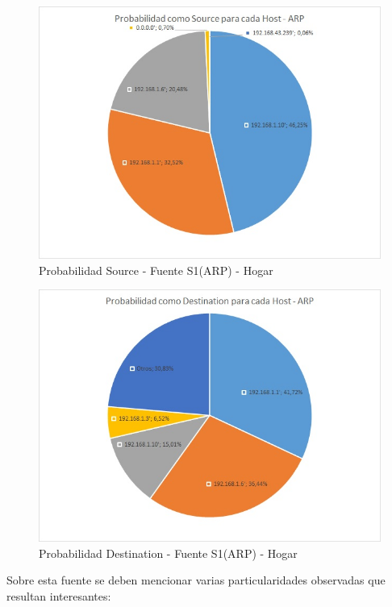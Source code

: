 \begin{figure}[h!]
\centering
\includegraphics[scale=0.7]{./img/proba_src_casa.jpg}
\caption{Probabilidad Source - Fuente S1(ARP) - Hogar}
\end{figure}

\begin{figure}[h!]
\centering
\includegraphics[scale=0.7]{./img/proba_dst_casa.jpg}
\caption{Probabilidad Destination - Fuente S1(ARP) - Hogar}
\end{figure}
\newpage

Sobre esta fuente se deben mencionar varias particularidades observadas que resultan interesantes:

